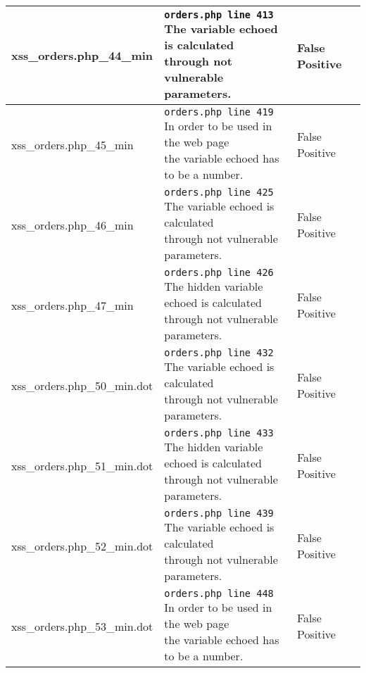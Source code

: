 \documentclass[11pt]{article}
\begin{document}
\begin{longtable}[H]{| p{} | p{} | p{} |}
	 	\hline
	  	xss\_orders.php\_44\_min 	
	  	& \makecell{ \texttt{orders.php line 413} \\
				The variable echoed is calculated \\
				through not vulnerable parameters.} 
	 	& False Positive \\


	 	\hline
	  	xss\_orders.php\_45\_min 	
	  	& \makecell{ \texttt{orders.php line 419} \\
				 In order to be used in the web page\\
				 the variable echoed has to be a number.}  
	 	& False Positive \\


	 	\hline
	  	xss\_orders.php\_46\_min 	
	  	& \makecell{ \texttt{orders.php line 425} \\
				 The variable echoed is calculated \\
				through not vulnerable parameters.}  
	 	& False Positive \\


	 	\hline
	  	xss\_orders.php\_47\_min	
	  	& \makecell{ \texttt{orders.php line 426} \\
				 The hidden variable echoed is calculated \\
				through not vulnerable parameters.}  
	 	& False Positive \\


	 	\hline
	  	xss\_orders.php\_50\_min.dot 	
	  	& \makecell{ \texttt{orders.php line 432} \\
				The variable echoed is calculated \\
				through not vulnerable parameters.}    
	 	& False Positive \\


	 	\hline
	  	xss\_orders.php\_51\_min.dot 	
	  	& \makecell{ \texttt{orders.php line 433} \\
				The hidden variable echoed is calculated \\
				through not vulnerable parameters.}    
	 	& False Positive \\

	 	\hline
	  	xss\_orders.php\_52\_min.dot 	
	  	& \makecell{ \texttt{orders.php line 439} \\
				The variable echoed is calculated \\
				through not vulnerable parameters.}    
	 	& False Positive \\

	 	\hline
	  	xss\_orders.php\_53\_min.dot 	
	  	& \makecell{ \texttt{orders.php line 448} \\
				In order to be used in the web page\\
				 the variable echoed has to be a number.}      
	 	& False Positive \\


\end{longtable}
\end{document}
